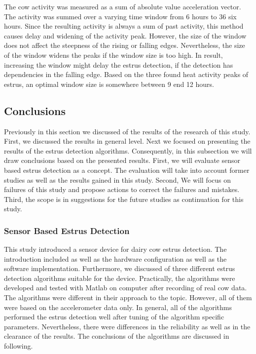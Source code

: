 \documentclass[english,12pt,a4paper,pdftex,elec,utf8]{aaltothesis}
\begin{document}
The cow activity was measured as a sum of absolute value acceleration vector. The activity was summed over a varying time window from 6 hours to 36 six hours. Since the resulting activity is always a sum of past activity, this method causes delay and widening of the activity peak. However, the size of the window does not affect the steepness of the rising or falling edges. Nevertheless, the size of the window widens the peaks if the window size is too high. In result, increasing the window might delay the estrus detection, if the detection has dependencies in the falling edge. Based on the three found heat activity peaks of estrus, an optimal window size is somewhere between 9 end 12 hours.



\subsection{Conclusions} \label{conclusionssection}

Previously in this section we discussed of the results of the research of this study. First, we discussed the results in general level. Next we focused on presenting the results of the estrus detection algorithms. Consequently, in this subsection we will draw conclusions based on the presented results. First, we will evaluate sensor based estrus detection as a concept. The evaluation will take into account former studies as well as the results gained in this study. Second, We will focus on failures of this study and propose actions to correct the failures and mistakes. Third, the scope is in suggestions for the future studies as continuation for this study.

\subsubsection{Sensor Based Estrus Detection}

This study introduced a sensor device for dairy cow estrus detection. The introduction included as well as the hardware configuration as well as the software implementation. Furthermore, we discussed of three different estrus detection algorithms suitable for the device. Practically, the algorithms were developed and tested with Matlab on computer after recording of real cow data. The algorithms were different in their approach to the topic. However, all of them were based on the accelerometer data only. In general, all of the algorithms performed the estrus detection well after tuning of the algorithm specific parameters. Nevertheless, there were differences in the reliability as well as in the clearance of the results. The conclusions of the algorithms are discussed in following.
\end{document}
